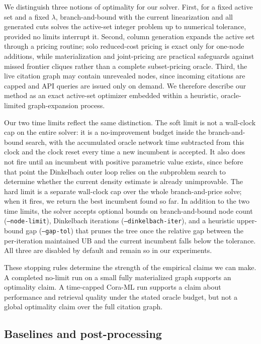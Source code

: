 \documentclass[12pt]{article}
\begin{document}
We distinguish three notions of optimality for our solver.  First, for a fixed active set and a fixed $\lambda$, branch-and-bound with the current linearization and all generated cuts solves the active-set integer problem up to numerical tolerance, provided no limits interrupt it.  Second, column generation expands the active set through a pricing routine; solo reduced-cost pricing is exact only for one-node additions, while materialization and joint-pricing are practical safeguards against missed frontier cliques rather than a complete subset-pricing oracle.  Third, the live citation graph may contain unrevealed nodes, since incoming citations are capped and API queries are issued only on demand.  We therefore describe our method as an exact active-set optimizer embedded within a heuristic, oracle-limited graph-expansion process.

Our two time limits reflect the same distinction.  The soft limit is not a wall-clock cap on the entire solver: it is a no-improvement budget inside the branch-and-bound search, with the accumulated oracle network time subtracted from this clock and the clock reset every time a new incumbent is accepted.  It also does not fire until an incumbent with positive parametric value exists, since before that point the Dinkelbach outer loop relies on the subproblem search to determine whether the current density estimate is already unimprovable.  The hard limit is a separate wall-clock cap over the whole branch-and-price solve; when it fires, we return the best incumbent found so far.  In addition to the two time limits, the solver accepts optional bounds on branch-and-bound node count (\texttt{--node-limit}), Dinkelbach iterations (\texttt{--dinkelbach-iter}), and a heuristic upper-bound gap (\texttt{--gap-tol}) that prunes the tree once the relative gap between the per-iteration maintained UB and the current incumbent falls below the tolerance.  All three are disabled by default and remain so in our experiments.

These stopping rules determine the strength of the empirical claims we can make.  A completed no-limit run on a small fully materialized graph supports an optimality claim.  A time-capped Cora-ML run supports a claim about performance and retrieval quality under the stated oracle budget, but not a global optimality claim over the full citation graph.

\subsection{Baselines and post-processing}
\label{subsec:baselines}
\end{document}
